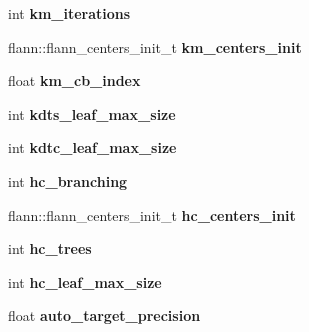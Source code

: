 \begin{DoxyCompactItemize}
\item 
\hypertarget{structmtf_1_1FLANNParams_ab0bcd0751196a280ff10d1806af224ff}{int {\bfseries km\-\_\-iterations}}\label{structmtf_1_1FLANNParams_ab0bcd0751196a280ff10d1806af224ff}

\item 
\hypertarget{structmtf_1_1FLANNParams_aaa4baf86f442d5975351a9a034fb03d3}{flann\-::flann\-\_\-centers\-\_\-init\-\_\-t {\bfseries km\-\_\-centers\-\_\-init}}\label{structmtf_1_1FLANNParams_aaa4baf86f442d5975351a9a034fb03d3}

\item 
\hypertarget{structmtf_1_1FLANNParams_a4f846d636b5af7694330c506d1faeb1d}{float {\bfseries km\-\_\-cb\-\_\-index}}\label{structmtf_1_1FLANNParams_a4f846d636b5af7694330c506d1faeb1d}

\item 
\hypertarget{structmtf_1_1FLANNParams_af4b7022e31781337c02b307ebad39e0d}{int {\bfseries kdts\-\_\-leaf\-\_\-max\-\_\-size}}\label{structmtf_1_1FLANNParams_af4b7022e31781337c02b307ebad39e0d}

\item 
\hypertarget{structmtf_1_1FLANNParams_aae4806382df98e507cb65a83f747d487}{int {\bfseries kdtc\-\_\-leaf\-\_\-max\-\_\-size}}\label{structmtf_1_1FLANNParams_aae4806382df98e507cb65a83f747d487}

\item 
\hypertarget{structmtf_1_1FLANNParams_a56f77f1aa67ab4697c5a8d4c4cd5155c}{int {\bfseries hc\-\_\-branching}}\label{structmtf_1_1FLANNParams_a56f77f1aa67ab4697c5a8d4c4cd5155c}

\item 
\hypertarget{structmtf_1_1FLANNParams_a5abf693bdf625b937048d2c5bc43ed85}{flann\-::flann\-\_\-centers\-\_\-init\-\_\-t {\bfseries hc\-\_\-centers\-\_\-init}}\label{structmtf_1_1FLANNParams_a5abf693bdf625b937048d2c5bc43ed85}

\item 
\hypertarget{structmtf_1_1FLANNParams_af9bb80c258a5a191c6a603116c68afcf}{int {\bfseries hc\-\_\-trees}}\label{structmtf_1_1FLANNParams_af9bb80c258a5a191c6a603116c68afcf}

\item 
\hypertarget{structmtf_1_1FLANNParams_acea396cf99d7f6703b803a08d14f81b1}{int {\bfseries hc\-\_\-leaf\-\_\-max\-\_\-size}}\label{structmtf_1_1FLANNParams_acea396cf99d7f6703b803a08d14f81b1}

\item 
\hypertarget{structmtf_1_1FLANNParams_a05a565af7532c502a028109f9f3c75e3}{float {\bfseries auto\-\_\-target\-\_\-precision}}\label{structmtf_1_1FLANNParams_a05a565af7532c502a028109f9f3c75e3}


\end{DoxyCompactItemize}
